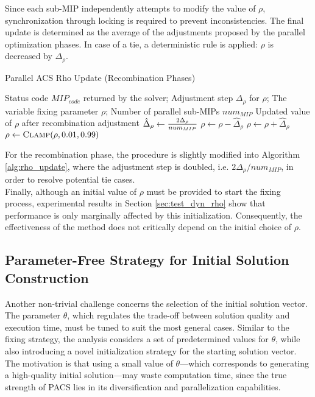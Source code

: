Since each sub-MIP independently attempts to modify the value of $\rho$, synchronization through locking is required to prevent inconsistencies. The final update is determined as the average of the adjustments proposed by the parallel optimization phases. In case of a tie, a deterministic rule is applied: $\rho$ is decreased by $\Delta_\rho$.  
\begin{algorithm}[H]
\caption{Parallel ACS Rho Update (Recombination Phases)}\label{alg:rho_update}
\begin{algorithmic}[1]
\Require Status code $MIP_{code}$ returned by the solver; Adjustment step $\Delta_\rho$ for $\rho$; The variable fixing parameter $\rho$; Number of parallel sub-MIPs $num_{MIP}$
\Ensure Updated value of $\rho$ after recombination adjustment
    \State $\hat\Delta_\rho \gets {2\Delta_\rho \over{num_{MIP}}}$
        \State $\rho \gets \rho - \hat\Delta_\rho$
    \EndIf
        \State $\rho \gets \rho + \hat\Delta_\rho$
    \EndIf
    \State $\rho \gets \Call{Clamp}{\rho,0.01,0.99}$
\EndFunction
\end{algorithmic}
\end{algorithm}
For the recombination phase, the procedure is slightly modified into Algorithm \ref{alg:rho_update}, where the adjustment step is doubled, i.e. $2\Delta_\rho / num_{MIP}$, in order to resolve potential tie cases.\\
Finally, although an initial value of $\rho$ must be provided to start the fixing process, experimental results in Section \ref{sec:test_dyn_rho} show that performance is only marginally affected by this initialization. Consequently, the effectiveness of the method does not critically depend on the initial choice of $\rho$.

\subsection{Parameter-Free Strategy for Initial Solution Construction}\label{sec:init_sol_maxFeas}
Another non-trivial challenge concerns the selection of the initial solution vector. The parameter $\theta$, which regulates the trade-off between solution quality and execution time, must be tuned to suit the most general cases. Similar to the fixing strategy, the analysis considers a set of predetermined values for $\theta$, while also introducing a novel initialization strategy for the starting solution vector.  
The motivation is that using a small value of $\theta$---which corresponds to generating a high-quality initial solution---may waste computation time, since the true strength of PACS lies in its diversification and parallelization capabilities.  

